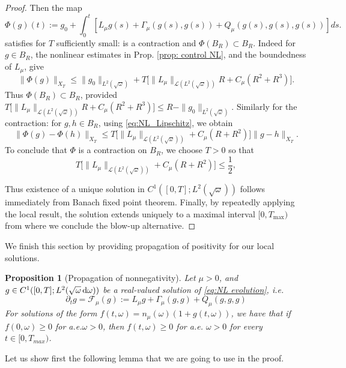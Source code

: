 \documentclass[reqno,11pt,letterpaper]{amsart}
\numberwithin{equation}{section}
\newcommand{\dd}{\, {\rm d}}
\newtheorem{proposition}{Proposition}[section]
\begin{document}
\begin{proof}
Then the map 
$$ \Phi(g)(t) := g_0+\int_0^t
\left[ L_\mu g(s)+\Gamma_\mu(g(s),g(s))+Q_\mu(g(s),g(s),g(s))
\right] ds.
$$ satisfies for $T$ sufficiently small: is a contraction and  $\Phi(B_R)\subset B_R.$ 
Indeed for $g\in B_R$, the nonlinear estimates in Prop. \ref{prop: control NL}, and the boundedness
of $L_\mu$, give
$$  \|\Phi(g)\|_{X_T}\leq
    \|g_0\|_{L^2(\sqrt{\omega})} +
    T\Big[ \|L_\mu\|_{\mathscr{L}(L^2(\sqrt{\omega}))}R  +
        C_\mu(R^2+R^3)\Big].$$
Thus $\Phi(B_R)\subset B_R$, provided  
 $T\Big[\|L_\mu\|_{\mathscr{L}(L^2(\sqrt{\omega}))}R + C_\mu(R^2+R^3)\Big]
    \leq R-\|g_0\|_{L^2(\sqrt{\omega})}$. 
Similarly for the contraction: for $g,h\in B_R$, using
\eqref{eq:NL_Lipschitz}, we obtain
$$ \|\Phi(g)-\Phi(h)\|_{X_T} \leq
T \Big[ \|L_\mu\|_{\mathscr{L}(L^2(\sqrt{\omega}))}+ C_\mu(R+R^2)\Big]\|g-h\|_{X_T}.
$$
To conclude that $\Phi$ is a contraction on $B_R$, we choose $T>0$ so that 
\begin{equation}\label{eq:condition_contraction}
    T\Big[ \|L_\mu\|_{\mathscr L(L^2(\sqrt{\omega}))}+
        C_\mu(R+R^2)\Big]\leq\frac{1}{2},
\end{equation}

Thus existence of a unique solution in $C^1([0,T];L^2(\sqrt{\omega}))$ follows immediately from Banach fixed point theorem. Finally, by repeatedly applying the local result, the solution extends uniquely to a maximal interval $[0,T_{\max})$ from where we conclude the blow-up alternative.
\end{proof}

We finish this section by providing propagation of positivity for our local solutions. 

\begin{proposition}[Propagation of nonnegativity]
\label{prop:prop_positivity}
Let $\mu>0$, and $ g\in C^1([0,T];L^2(\sqrt{\omega} \dd\omega))
$ 
be a real-valued solution of \eqref{eq:NL evolution}, i.e. 
$$\partial_t g = \mathcal{F}_\mu(g) :=
 L_\mu g+ \Gamma_\mu(g,g) +Q_\mu(g,g,g)
$$
For solutions of the form $f(t,\omega)= n_\mu(\omega)(1+g(t,\omega))$, we have that if 
$ f(0,\omega)\geq0 $ for a.e.$\omega>0$, then  
$ f(t,\omega)\geq 0$ for a.e. $\omega>0$
for every $t\in[0,T_{max})$.
\end{proposition}

Let us show first the following lemma that we are going to use in the proof. 
\end{document}
